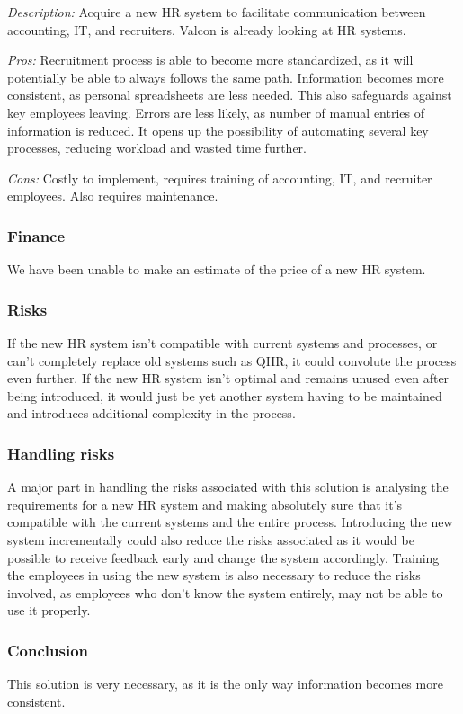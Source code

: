 \emph{Description:} Acquire a new HR system to facilitate communication between accounting, IT, and recruiters.
Valcon is already looking at HR systems.

\emph{Pros:} Recruitment process is able to become more standardized, as it will potentially be able to always follows the same path.
Information becomes more consistent, as personal spreadsheets are less needed. 
This also safeguards against key employees leaving.
Errors are less likely, as number of manual entries of information is reduced.
It opens up the possibility of automating several key processes, reducing workload and wasted time further.

\emph{Cons:} Costly to implement, requires training of accounting, IT, and recruiter employees.
Also requires maintenance.

\subsubsection{Finance}
We have been unable to make an estimate of the price of a new HR system.

\subsubsection{Risks}
If the new HR system isn't compatible with current systems and processes, or can't completely replace old systems such as QHR, it could convolute the process even further. 
If the new HR system isn't optimal and remains unused even after being introduced, it would just be yet another system having to be maintained and introduces additional complexity in the process.

\subsubsection{Handling risks}
A major part in handling the risks associated with this solution is analysing the requirements for a new HR system and making absolutely sure that it's compatible with the current systems and the entire process. 
Introducing the new system incrementally could also reduce the risks associated as it would be possible to receive feedback early and change the system accordingly. 
Training the employees in using the new system is also necessary to reduce the risks involved, as employees who don't know the system entirely, may not be able to use it properly.

\subsubsection{Conclusion} 
This solution is very necessary, as it is the only way information becomes more consistent.
